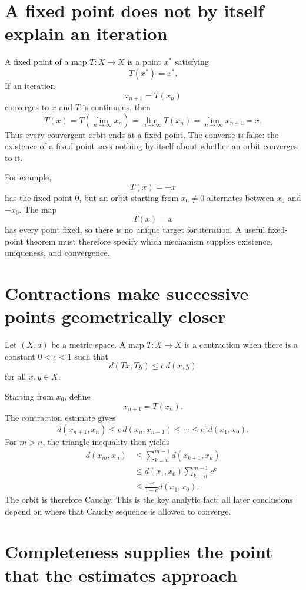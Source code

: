 
\section{A fixed point does not by itself explain an iteration}

A fixed point of a map \(T:X\to X\) is a point \(x^*\) satisfying
\[
  T(x^*)=x^*.
\]
If an iteration
\[
  x_{n+1}=T(x_n)
\]
converges to \(x\) and \(T\) is continuous, then
\[
  T(x)=T\left(\lim_{n\to\infty}x_n\right)
  =\lim_{n\to\infty}T(x_n)
  =\lim_{n\to\infty}x_{n+1}
  =x.
\]
Thus every convergent orbit ends at a fixed point.  The converse is false: the existence of a fixed point says nothing by itself about whether an orbit converges to it.

For example,
\[
  T(x)=-x
\]
has the fixed point \(0\), but an orbit starting from \(x_0\ne0\) alternates between \(x_0\) and \(-x_0\).  The map
\[
  T(x)=x
\]
has every point fixed, so there is no unique target for iteration.  A useful fixed-point theorem must therefore specify which mechanism supplies existence, uniqueness, and convergence.

\section{Contractions make successive points geometrically closer}

Let \((X,d)\) be a metric space.  A map \(T:X\to X\) is a contraction when there is a constant \(0<c<1\) such that
\[
  d(Tx,Ty)\le c\,d(x,y)
\]
for all \(x,y\in X\).

Starting from \(x_0\), define
\[
  x_{n+1}=T(x_n).
\]
The contraction estimate gives
\[
  d(x_{n+1},x_n)
  \le c\,d(x_n,x_{n-1})
  \le\cdots\le c^n d(x_1,x_0).
\]
For \(m>n\), the triangle inequality then yields
\[
\begin{aligned}
  d(x_m,x_n)
  &\le\sum_{k=n}^{m-1}d(x_{k+1},x_k)\\
  &\le d(x_1,x_0)\sum_{k=n}^{m-1}c^k\\
  &\le\frac{c^n}{1-c}d(x_1,x_0).
\end{aligned}
\]
The orbit is therefore Cauchy.  This is the key analytic fact; all later conclusions depend on where that Cauchy sequence is allowed to converge.

\section{Completeness supplies the point that the estimates approach}

